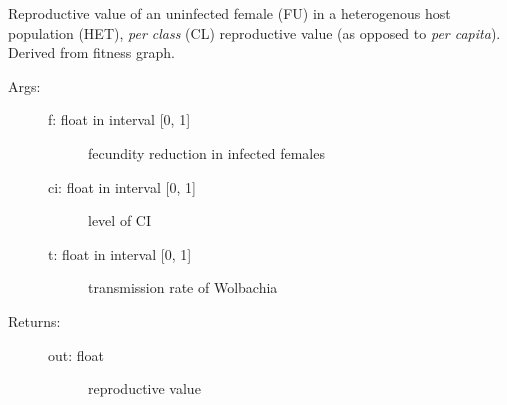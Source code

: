 \documentclass[letterpaper,10pt,english]{sphinxmanual}
\begin{document}

\begin{fulllineitems}
\label{index:wspec.analytical.reproval_FUHETCL}
Reproductive value of an uninfected female (FU) in a 
heterogenous host population (HET), \emph{per class} (CL) reproductive 
value (as opposed to \emph{per capita}). Derived from fitness graph.
\begin{description}
\item[{Args:}] \leavevmode\begin{description}
\item[{f: float in interval {[}0, 1{]}}] \leavevmode
fecundity reduction in infected females

\item[{ci: float in interval {[}0, 1{]}}] \leavevmode
level of CI

\item[{t: float in interval {[}0, 1{]}}] \leavevmode
transmission rate of Wolbachia

\end{description}

\item[{Returns:}] \leavevmode\begin{description}
\item[{out: float}] \leavevmode
reproductive value

\end{description}

\end{description}

\end{fulllineitems}

\end{document}
